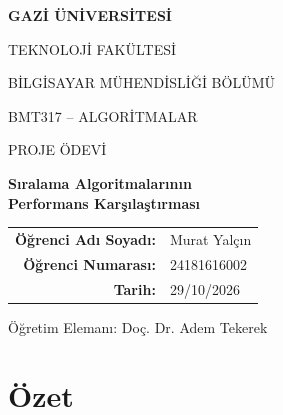 \documentclass[12pt,a4paper]{article}
\newcommand{\OgrenciAdi}{Murat Yalçın}
\newcommand{\OgrenciNumarasi}{24181616002}
\newcommand{\TeslimTarihi}{29/10/2026}
\begin{document}
\hypersetup{pageanchor=false}
\begin{titlepage}
  \centering
  \thispagestyle{empty}

  \vspace*{1.2cm}
  {\Large\bfseries GAZİ ÜNİVERSİTESİ\par}
  \vspace{0.35cm}
  {\large TEKNOLOJİ FAKÜLTESİ\par}
  {\large BİLGİSAYAR MÜHENDİSLİĞİ BÖLÜMÜ\par}

  \vspace{2.4cm}
  {\large BMT317 -- ALGORİTMALAR\par}
  \vspace{0.25cm}
  {\large PROJE ÖDEVİ\par}

  \vspace{1.8cm}
  {\LARGE\bfseries Sıralama Algoritmalarının\\[0.25cm]
   Performans Karşılaştırması\par}

  \vspace{2.6cm}
  \begin{tabular}{rl}
    \textbf{Öğrenci Adı Soyadı:} & \OgrenciAdi \\[0.35cm]
    \textbf{Öğrenci Numarası:}   & \OgrenciNumarasi \\[0.35cm]
    \textbf{Tarih:}              & \TeslimTarihi \\
  \end{tabular}

  \vfill
  {\large Öğretim Elemanı: Doç. Dr. Adem Tekerek\par}
  \vspace{0.6cm}
\end{titlepage}
\hypersetup{pageanchor=true}

\setcounter{page}{1}

\section*{Özet}
\end{document}
